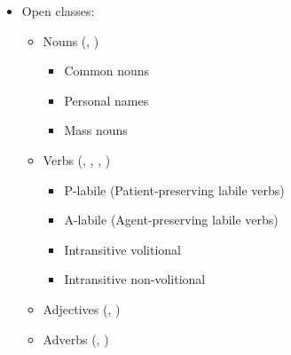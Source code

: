 \begin{itemize}
\item[] Open classes:
\begin{itemize}
\item[]Nouns  (, 
)
\begin{itemize}
\item[]Common nouns
\item[]Personal names
\item[]Mass nouns
\end{itemize}
\item[]Verbs  (, , , )
\begin{itemize}
\item[]P-labile (Patient-preserving labile verbs)
\item[]A-labile (Agent-preserving labile verbs)
\item[]Intransitive volitional
\item[]Intransitive non-volitional
\end{itemize}
\item[]Adjectives  (, )
\item[]Adverbs  (, )
\end{itemize}


\end{itemize}
